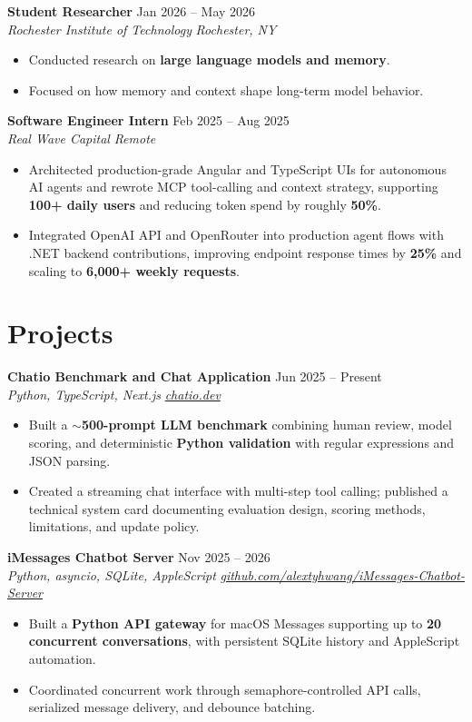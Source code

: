 \documentclass[10pt,letterpaper]{article}
\newif\ifresumeFirstRole
\newcommand{\resumeRole}[4]{%
  \ifresumeFirstRole
    \global\resumeFirstRolefalse
  \else
    \vspace{0pt plus 1fill}%
  \fi
  \textbf{#1} \hfill #2\\
  \textit{#3} \hfill \textit{#4}
}
\begin{document}
\resumeRole{Student Researcher}{Jan 2026 -- May 2026}{Rochester Institute of Technology}{Rochester, NY}
\begin{itemize}
  \item Conducted research on \textbf{large language models and memory}.
  \item Focused on how memory and context shape long-term model behavior.
\end{itemize}

\resumeRole{Software Engineer Intern}{Feb 2025 -- Aug 2025}{Real Wave Capital}{Remote}
\begin{itemize}
  \item Architected production-grade Angular and TypeScript UIs for autonomous AI agents and rewrote MCP tool-calling and context strategy, supporting \textbf{100+ daily users} and reducing token spend by roughly \textbf{50\%}.
  \item Integrated OpenAI API and OpenRouter into production agent flows with .NET backend contributions, improving endpoint response times by \textbf{25\%} and scaling to \textbf{6,000+ weekly requests}.
\end{itemize}

\section*{Projects}
\resumeRole{Chatio Benchmark and Chat Application}{Jun 2025 -- Present}{Python, TypeScript, Next.js}{\href{https://chatio.dev}{chatio.dev}}
\begin{itemize}
  \item Built a \textbf{${\sim}$500-prompt LLM benchmark} combining human review, model scoring, and deterministic \textbf{Python validation} with regular expressions and JSON parsing.
  \item Created a streaming chat interface with multi-step tool calling; published a technical system card documenting evaluation design, scoring methods, limitations, and update policy.
\end{itemize}

\resumeRole{iMessages Chatbot Server}{Nov 2025 -- 2026}{Python, asyncio, SQLite, AppleScript}{\href{https://github.com/alextyhwang/iMessages-Chatbot-Server}{github.com/alextyhwang/iMessages-Chatbot-Server}}
\begin{itemize}
  \item Built a \textbf{Python API gateway} for macOS Messages supporting up to \textbf{20 concurrent conversations}, with persistent SQLite history and AppleScript automation.
  \item Coordinated concurrent work through semaphore-controlled API calls, serialized message delivery, and debounce batching.
\end{itemize}
\end{document}
